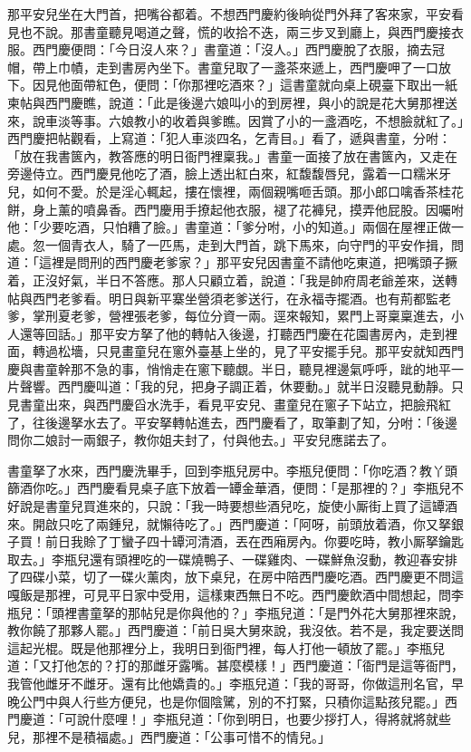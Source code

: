 那平安兒坐在大門首，把嘴谷都着。不想西門慶約後晌從門外拜了客來家，平安看見也不說。那書童聽見喝道之聲，慌的收拾不迭，兩三步叉到廳上，與西門慶接衣服。西門慶便問：「今日沒人來？」書童道：「沒人。」西門慶脫了衣服，摘去冠帽，帶上巾幘，走到書房內坐下。書童兒取了一盞茶來遞上，西門慶呷了一口放下。因見他面帶紅色，便問：「你那裡吃酒來？」這書童就向桌上硯臺下取出一紙柬帖與西門慶瞧，說道：「此是後邊六娘叫小的到房裡，與小的說是花大舅那裡送來，說車淡等事。六娘教小的收着與爹瞧。因賞了小的一盞酒吃，不想臉就紅了。」西門慶把帖觀看，上寫道：「犯人車淡四名，乞青目。」看了，遞與書童，分咐：「放在我書篋內，教答應的明日衙門裡稟我。」書童一面接了放在書篋內，又走在旁邊侍立。西門慶見他吃了酒，臉上透出紅白來，紅馥馥唇兒，露着一口糯米牙兒，如何不愛。於是淫心輒起，摟在懷裡，兩個親嘴咂舌頭。那小郎口噙香茶桂花餅，身上薰的噴鼻香。西門慶用手撩起他衣服，褪了花褲兒，摸弄他屁股。因囑咐他：「少要吃酒，只怕糟了臉。」書童道：「爹分咐，小的知道。」兩個在屋裡正做一處。忽一個青衣人，騎了一匹馬，走到大門首，跳下馬來，向守門的平安作揖，問道：「這裡是問刑的西門慶老爹家？」那平安兒因書童不請他吃東道，把嘴頭子撅着，正沒好氣，半日不答應。那人只顧立着，說道：「我是帥府周老爺差來，送轉帖與西門老爹看。明日與新平寨坐營須老爹送行，在永福寺擺酒。也有荊都監老爹，掌刑夏老爹，營裡張老爹，每位分資一兩。逕來報知，累門上哥稟稟進去，小人還等回話。」那平安方拏了他的轉帖入後邊，打聽西門慶在花園書房內，走到裡面，轉過松墻，只見畫童兒在窻外臺基上坐的，見了平安擺手兒。那平安就知西門慶與書童幹那不急的事，悄悄走在窻下聽覷。半日，聽見裡邊氣呼呼，跐的地平一片聲響。西門慶叫道：「我的兒，把身子調正着，休要動。」就半日沒聽見動靜。{}只見書童出來，與西門慶舀水洗手，看見平安兒、畫童兒在窻子下站立，把臉飛紅了，往後邊拏水去了。平安拏轉帖進去，西門慶看了，取筆劃了知，分咐：「後邊問你二娘討一兩銀子，教你姐夫封了，付與他去。」平安兒應諾去了。

書童拏了水來，西門慶洗畢手，回到李瓶兒房中。李瓶兒便問：「你吃酒？教丫頭篩酒你吃。」西門慶看見桌子底下放着一罈金華酒，便問：「是那裡的？」李瓶兒不好說是書童兒買進來的，只說：「我一時要想些酒兒吃，旋使小厮街上買了這罈酒來。開啟只吃了兩鍾兒，就懶待吃了。」西門慶道：「阿呀，前頭放着酒，你又拏銀子買！前日我賒了丁蠻子四十罈河清酒，丟在西廂房內。你要吃時，教小厮拏鑰匙取去。」李瓶兒還有頭裡吃的一碟燒鴨子、一碟雞肉、一碟鮮魚沒動，教迎春安排了四碟小菜，切了一碟火薰肉，放下桌兒，在房中陪西門慶吃酒。西門慶更不問這嘎飯是那裡，可見平日家中受用，這樣東西無日不吃。西門慶飲酒中間想起，問李瓶兒：「頭裡書童拏的那帖兒是你與他的？」李瓶兒道：「是門外花大舅那裡來說，教你饒了那夥人罷。」西門慶道：「前日吳大舅來說，我沒依。若不是，我定要送問這起光棍。既是他那裡分上，我明日到衙門裡，每人打他一頓放了罷。」李瓶兒道：「又打他怎的？打的那雌牙露嘴。甚麼模樣！」西門慶道：「衙門是這等衙門，我管他雌牙不雌牙。還有比他嬌貴的。」李瓶兒道：「我的哥哥，你做這刑名官，早晚公門中與人行些方便兒，也是你個陰騭，別的不打緊，只積你這點孩兒罷。」西門慶道：「可說什麼哩！」李瓶兒道：「你到明日，也要少拶打人，得將就將就些兒，那裡不是積福處。」西門慶道：「公事可惜不的情兒。」

